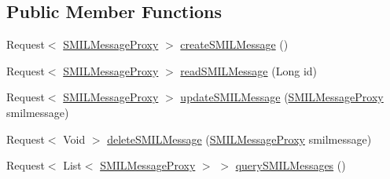 \subsection*{Public Member Functions}
\begin{DoxyCompactItemize}
\item 
Request$<$ \hyperlink{interfacecsc440_1_1nuf_1_1shared_1_1_s_m_i_l_message_proxy}{S\-M\-I\-L\-Message\-Proxy} $>$ \hyperlink{interfacecsc440_1_1nuf_1_1shared_1_1_s_m_i_l_engine_request_ae676cd26bbe66d70138183bfabc7f437}{create\-S\-M\-I\-L\-Message} ()
\item 
Request$<$ \hyperlink{interfacecsc440_1_1nuf_1_1shared_1_1_s_m_i_l_message_proxy}{S\-M\-I\-L\-Message\-Proxy} $>$ \hyperlink{interfacecsc440_1_1nuf_1_1shared_1_1_s_m_i_l_engine_request_ac8a27dbfa795c56f55621c1bf9fa1cd2}{read\-S\-M\-I\-L\-Message} (Long id)
\item 
Request$<$ \hyperlink{interfacecsc440_1_1nuf_1_1shared_1_1_s_m_i_l_message_proxy}{S\-M\-I\-L\-Message\-Proxy} $>$ \hyperlink{interfacecsc440_1_1nuf_1_1shared_1_1_s_m_i_l_engine_request_abb67e9ef53e8db25c95928f18d25b439}{update\-S\-M\-I\-L\-Message} (\hyperlink{interfacecsc440_1_1nuf_1_1shared_1_1_s_m_i_l_message_proxy}{S\-M\-I\-L\-Message\-Proxy} smilmessage)
\item 
Request$<$ Void $>$ \hyperlink{interfacecsc440_1_1nuf_1_1shared_1_1_s_m_i_l_engine_request_aab5cf1bfa01de349bae730b5eddbe6e9}{delete\-S\-M\-I\-L\-Message} (\hyperlink{interfacecsc440_1_1nuf_1_1shared_1_1_s_m_i_l_message_proxy}{S\-M\-I\-L\-Message\-Proxy} smilmessage)
\item 
Request$<$ List$<$ \hyperlink{interfacecsc440_1_1nuf_1_1shared_1_1_s_m_i_l_message_proxy}{S\-M\-I\-L\-Message\-Proxy} $>$ $>$ \hyperlink{interfacecsc440_1_1nuf_1_1shared_1_1_s_m_i_l_engine_request_a3eee4d421f3a52debf63d9145b69aaac}{query\-S\-M\-I\-L\-Messages} ()
\end{DoxyCompactItemize}


